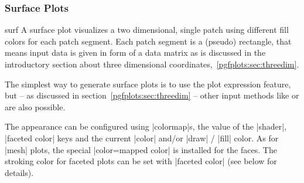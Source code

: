 \subsubsection{Surface Plots}
\label{sec:pgfplots:surfplots}
\begin{plottype}[/pgfplots]{surf}
	A surface plot visualizes a two dimensional, single patch using different fill colors for each patch segment. Each patch segment is a (pseudo) rectangle, that means input data is given in form of a data matrix as is discussed in the introductory section about three dimensional coordinates,~\ref{pgfplots:sec:threedim}.

\pgfplotsexpensiveexample
\begin{codeexample}[]
\end{codeexample}

	The simplest way to generate surface plots is to use the plot expression feature, but -- as discussed in section~\ref{pgfplots:sec:threedim} -- other input methods like  or  are also possible. 

	The appearance can be configured using |colormap|s, the value of the |shader|, |faceted color| keys and the current |color| and/or |draw| / |fill| color. As for |mesh| plots, the special |color=mapped color| is installed for the faces. The stroking color for faceted plots can be set with |faceted color| (see below for details).

\pgfplotsexpensiveexample
\begin{codeexample}[]
\end{codeexample}

\pgfplotsexpensiveexample
\begin{codeexample}[]
\end{codeexample}


\end{plottype}
